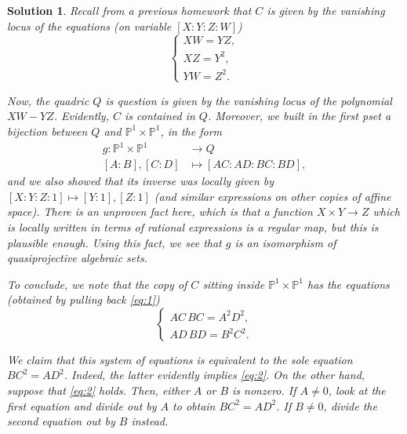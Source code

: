 \documentclass{article}
\theoremstyle{nonumberplain}
\newtheorem{sol}{Solution}
\newcommand{\PP}{\mathbb{P}}
\begin{document}
\begin{sol}
Recall from a previous homework that $C$ is given by the vanishing locus of the equations (on variable $[X:Y:Z:W]$)
\begin{equation}\label{eq:1}
\begin{cases}
XW = YZ,\\
XZ = Y^2,\\
YW = Z^2.
\end{cases}
\end{equation}

Now, the quadric $Q$ is question is given by the vanishing locus of the polynomial $XW - YZ$. Evidently, $C$ is contained in $Q$. Moreover, we built in the first pset a bijection between $Q$ and $\PP^1 \times \PP^1$, in the form
\begin{equation}
\begin{aligned}
g \colon \PP^1 \times \PP^1 &\to Q\\
[A:B],[C:D] &\mapsto [AC:AD:BC:BD],
\end{aligned}
\end{equation}
and we also showed that its inverse was locally given by $[X:Y:Z:1] \mapsto [Y:1],[Z:1]$ (and similar expressions on other copies of affine space). There is an unproven fact here, which is that a function $X \times Y \to Z$ which is locally written in terms of rational expressions is a regular map, but this is plausible enough. Using this fact, we see that $g$ is an isomorphism of quasiprojective algebraic sets.

To conclude, we note that the copy of $C$ sitting inside $\PP^1 \times \PP^1$ has the equations (obtained by pulling back \eqref{eq:1})
\begin{equation}\label{eq:2}
\begin{cases}
AC \, BC = A^2 D^2,\\
AD \, BD = B^2 C^2.
\end{cases}
\end{equation}

We claim that this system of equations is equivalent to the sole equation $BC^2 = AD^2$. Indeed, the latter evidently implies \eqref{eq:2}. On the other hand, suppose that \eqref{eq:2} holds. Then, either $A$ or $B$ is nonzero. If $A \neq 0$, look at the first equation and divide out by $A$ to obtain $BC^2 = AD^2$. If $B \neq 0$, divide the second equation out by $B$ instead.
\end{sol}
\end{document}
